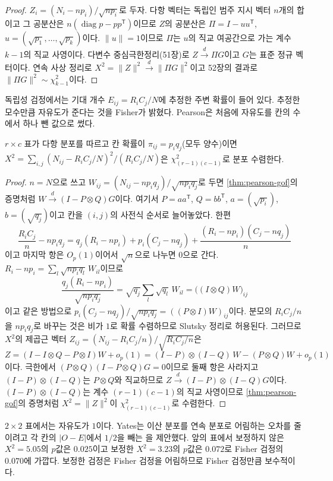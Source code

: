 \begin{proof}
$Z_i=(N_i-np_i)/\sqrt{np_i}$로 두자. 다항 벡터는 독립인 범주 지시 벡터 $n$개의 합이고 그 공분산은 $n(\operatorname{diag}p-pp^{\mathsf T})$이므로 $Z$의 공분산은 $\Pi=I-uu^{\mathsf T}$, $u=(\sqrt{p_1},\dots,\sqrt{p_k})$이다. $\|u\|=1$이므로 $\Pi$는 $u$의 직교 여공간으로 가는 계수 $k-1$의 직교 사영이다. 다변수 중심극한정리(51장)로 $Z\xrightarrow{d}\Pi G$이고 $G$는 표준 정규 벡터이다. 연속 사상 정리로 $X^2=\|Z\|^2\xrightarrow{d}\|\Pi G\|^2$이고 52장의 결과로 $\|\Pi G\|^2\sim\chi^2_{k-1}$이다.
\end{proof}

독립성 검정에서는 기대 개수 $E_{ij}=R_iC_j/N$에 추정한 주변 확률이 들어 있다. 추정한 모수만큼 자유도가 준다는 것을 Fisher가 밝혔다\cite{fisher1922chi}. Pearson은 처음에 자유도를 칸의 수에서 하나 뺀 값으로 썼다.

\begin{theorem}
\label{thm:independence-df}
$r\times c$ 표가 다항 분포를 따르고 칸 확률이 $\pi_{ij}=p_iq_j$(모두 양수)이면 $X^2=\sum_{i,j}(N_{ij}-R_iC_j/N)^2/(R_iC_j/N)$은 $\chi^2_{(r-1)(c-1)}$로 분포 수렴한다.
\end{theorem}

\begin{proof}
$n=N$으로 쓰고 $W_{ij}=(N_{ij}-np_iq_j)/\sqrt{np_iq_j}$로 두면 \cref{thm:pearson-gof}의 증명처럼 $W\xrightarrow{d}(I-P\otimes Q)G$이다. 여기서 $P=aa^{\mathsf T}$, $Q=bb^{\mathsf T}$, $a=(\sqrt{p_i})$, $b=(\sqrt{q_j})$이고 칸을 $(i,j)$의 사전식 순서로 늘어놓았다. 한편
\[
\frac{R_iC_j}n-np_iq_j=q_j(R_i-np_i)+p_i(C_j-nq_j)+\frac{(R_i-np_i)(C_j-nq_j)}n
\]
이고 마지막 항은 $O_p(1)$이어서 $\sqrt n$으로 나누면 $0$으로 간다. $R_i-np_i=\sum_l\sqrt{np_iq_l}\,W_{il}$이므로
\[
\frac{q_j(R_i-np_i)}{\sqrt{np_iq_j}}=\sqrt{q_j}\sum_l\sqrt{q_l}\,W_{il}=\bigl((I\otimes Q)W\bigr)_{ij}
\]
이고 같은 방법으로 $p_i(C_j-nq_j)/\sqrt{np_iq_j}=((P\otimes I)W)_{ij}$이다. 분모의 $R_iC_j/n$을 $np_iq_j$로 바꾸는 것은 비가 $1$로 확률 수렴하므로 Slutsky 정리로 허용된다. 그러므로 $X^2$의 제곱근 벡터 $Z_{ij}=(N_{ij}-R_iC_j/n)/\sqrt{R_iC_j/n}$은
\[
Z=(I-I\otimes Q-P\otimes I)W+o_p(1)=(I-P)\otimes(I-Q)\,W-(P\otimes Q)W+o_p(1)
\]
이다. 극한에서 $(P\otimes Q)(I-P\otimes Q)G=0$이므로 둘째 항은 사라지고 $(I-P)\otimes(I-Q)$는 $P\otimes Q$와 직교하므로 $Z\xrightarrow{d}(I-P)\otimes(I-Q)G$이다. $(I-P)\otimes(I-Q)$는 계수 $(r-1)(c-1)$의 직교 사영이므로 \cref{thm:pearson-gof}의 증명처럼 $X^2=\|Z\|^2$이 $\chi^2_{(r-1)(c-1)}$로 수렴한다.
\end{proof}

$2\times2$ 표에서는 자유도가 $1$이다. Yates는 이산 분포를 연속 분포로 어림하는 오차를 줄이려고 각 칸의 $|O-E|$에서 $1/2$을 빼는 을 제안했다\cite{yates1934}. 앞의 표에서 보정하지 않은 $X^2=5.05$의 $p$값은 $0.025$이고 보정한 $X^2=3.23$의 $p$값은 $0.072$로 Fisher 검정의 $0.070$에 가깝다. 보정한 검정은 Fisher 검정을 어림하므로 Fisher 검정만큼 보수적이다.

